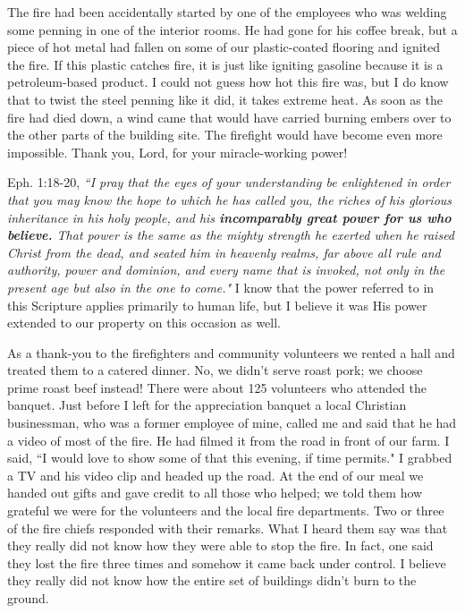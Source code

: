 \documentclass[oneside,12pt]{book}
\begin{document}
The fire had been accidentally started by one of the employees who was welding some penning in one of the interior rooms. He had gone for his coffee break, but a piece of hot metal had fallen on some of our plastic-coated flooring and ignited the fire. If this plastic catches fire, it is just like igniting gasoline because it is a petroleum-based product. I could not guess how hot this fire was, but I do know that to twist the steel penning like it did, it takes extreme heat. As soon as the fire had died down, a wind came that would have carried burning embers over to the other parts of the building site. The firefight would have become even more impossible. Thank you, Lord, for your miracle-working power! 

Eph. 1:18-20, \textit{``I pray that the eyes of your understanding be enlightened in order that you may know the hope to which he has called you, the riches of his glorious inheritance in his holy people, and his \textbf{incomparably great power for us who believe.} That power is the same as the mighty strength he exerted when he raised Christ from the dead, and seated him in heavenly realms, far above all rule and authority, power and dominion, and every name that is invoked, not only in the present age but also in the one to come."} I know that the power referred to in this Scripture applies primarily to human life, but I believe it was His power extended to our property on this occasion as well. 

As a thank-you to the firefighters and community volunteers we rented a hall and treated them to a catered dinner. No, we didn't serve roast pork; we choose prime roast beef instead! There were about 125 volunteers who attended the banquet. Just before I left for the appreciation banquet a local Christian businessman, who was a former employee of mine, called me and said that he had a video of most of the fire. He had filmed it from the road in front of our farm. I said, ``I would love to show some of that this evening, if time permits." I grabbed a TV and his video clip and headed up the road. At the end of our meal we handed out gifts and gave credit to all those who helped; we told them how grateful we were for the volunteers and the local fire departments. Two or three of the fire chiefs responded with their remarks. What I heard them say was that they really did not know how they were able to stop the fire. In fact, one said they lost the fire three times and somehow it came back under control. I believe they really did not know how the entire set of buildings didn't burn to the ground.
\end{document}
